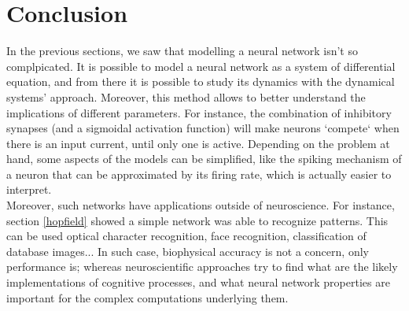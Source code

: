 \documentclass{article}
\begin{document}
\section{Conclusion}
\indent \indent In the previous sections, we saw that modelling a neural network isn't so complpicated. It is possible to model a neural network as a system of differential equation, and from there it is possible to study its dynamics with the dynamical systems' approach.
Moreover, this method allows to better understand the implications of different parameters. For instance, the combination of inhibitory synapses (and a sigmoidal activation function) will make neurons `compete` when there is an input current, until only one is active. Depending on the problem at hand, some aspects of the models can be simplified, like the spiking mechanism of a neuron that can be approximated by its firing rate, which is actually easier to interpret. \\
\indent Moreover, such networks have applications outside of neuroscience. For instance, section \ref{hopfield} showed a simple network was able to recognize patterns. This can be used optical character recognition, face recognition, classification of database images... In such case, biophysical accuracy is not a concern, only performance is; whereas neuroscientific approaches try to find what are the likely implementations of cognitive processes, and what neural network properties are important for the complex computations underlying them.
\end{document}
